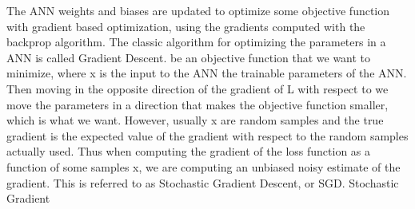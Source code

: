 The ANN weights and biases are updated to optimize some objective function
with gradient based optimization, using the gradients computed with the backprop algorithm.
The classic algorithm for optimizing the parameters in a ANN is called Gradient
Descent. be an objective function that we want to minimize, where
x is the input to the ANN the trainable parameters of the ANN. Then
moving in the opposite direction of the gradient of L with respect to  we move
the parameters in a direction that makes the objective function smaller, which is
what we want. However, usually x are random samples and the true gradient is
the expected value of the gradient with respect to the random samples actually
used. Thus when computing the gradient of the loss function as a function of
some samples x, we are computing an unbiased noisy estimate of the gradient.
This is referred to as Stochastic Gradient Descent, or SGD. Stochastic Gradient


